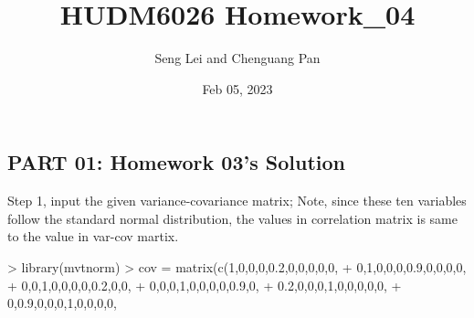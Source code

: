 \documentclass[
]{article}
\title{HUDM6026 Homework\_04}
\author{Seng Lei and Chenguang Pan}
\date{Feb 05, 2023}
\newenvironment{Shaded}{\begin{snugshade}}{\end{snugshade}}
\newcommand{\DecValTok}[1]{\textcolor[rgb]{0.00,0.00,0.81}{#1}}
\newcommand{\FloatTok}[1]{\textcolor[rgb]{0.00,0.00,0.81}{#1}}
\newcommand{\FunctionTok}[1]{\textcolor[rgb]{0.00,0.00,0.00}{#1}}
\newcommand{\NormalTok}[1]{#1}
\newcommand{\OtherTok}[1]{\textcolor[rgb]{0.56,0.35,0.01}{#1}}
\newcommand{\SpecialCharTok}[1]{\textcolor[rgb]{0.00,0.00,0.00}{#1}}
\begin{document}
\maketitle

\hypertarget{part-01-homework-03s-solution}{%
\subsection{PART 01: Homework 03's
Solution}\label{part-01-homework-03s-solution}}

Step 1, input the given variance-covariance matrix; Note, since these
ten variables follow the standard normal distribution, the values in
correlation matrix is same to the value in var-cov martix.

\begin{Shaded}
\begin{Highlighting}[]
\SpecialCharTok{\textgreater{}} \FunctionTok{library}\NormalTok{(mvtnorm)}
\SpecialCharTok{\textgreater{}}\NormalTok{ cov }\OtherTok{=} \FunctionTok{matrix}\NormalTok{(}\FunctionTok{c}\NormalTok{(}\DecValTok{1}\NormalTok{,}\DecValTok{0}\NormalTok{,}\DecValTok{0}\NormalTok{,}\DecValTok{0}\NormalTok{,}\FloatTok{0.2}\NormalTok{,}\DecValTok{0}\NormalTok{,}\DecValTok{0}\NormalTok{,}\DecValTok{0}\NormalTok{,}\DecValTok{0}\NormalTok{,}\DecValTok{0}\NormalTok{,}
\SpecialCharTok{+}                \DecValTok{0}\NormalTok{,}\DecValTok{1}\NormalTok{,}\DecValTok{0}\NormalTok{,}\DecValTok{0}\NormalTok{,}\DecValTok{0}\NormalTok{,}\FloatTok{0.9}\NormalTok{,}\DecValTok{0}\NormalTok{,}\DecValTok{0}\NormalTok{,}\DecValTok{0}\NormalTok{,}\DecValTok{0}\NormalTok{,}
\SpecialCharTok{+}                \DecValTok{0}\NormalTok{,}\DecValTok{0}\NormalTok{,}\DecValTok{1}\NormalTok{,}\DecValTok{0}\NormalTok{,}\DecValTok{0}\NormalTok{,}\DecValTok{0}\NormalTok{,}\DecValTok{0}\NormalTok{,}\FloatTok{0.2}\NormalTok{,}\DecValTok{0}\NormalTok{,}\DecValTok{0}\NormalTok{,}
\SpecialCharTok{+}                \DecValTok{0}\NormalTok{,}\DecValTok{0}\NormalTok{,}\DecValTok{0}\NormalTok{,}\DecValTok{1}\NormalTok{,}\DecValTok{0}\NormalTok{,}\DecValTok{0}\NormalTok{,}\DecValTok{0}\NormalTok{,}\DecValTok{0}\NormalTok{,}\FloatTok{0.9}\NormalTok{,}\DecValTok{0}\NormalTok{,}
\SpecialCharTok{+}                \FloatTok{0.2}\NormalTok{,}\DecValTok{0}\NormalTok{,}\DecValTok{0}\NormalTok{,}\DecValTok{0}\NormalTok{,}\DecValTok{1}\NormalTok{,}\DecValTok{0}\NormalTok{,}\DecValTok{0}\NormalTok{,}\DecValTok{0}\NormalTok{,}\DecValTok{0}\NormalTok{,}\DecValTok{0}\NormalTok{,}
\SpecialCharTok{+}                \DecValTok{0}\NormalTok{,}\FloatTok{0.9}\NormalTok{,}\DecValTok{0}\NormalTok{,}\DecValTok{0}\NormalTok{,}\DecValTok{0}\NormalTok{,}\DecValTok{1}\NormalTok{,}\DecValTok{0}\NormalTok{,}\DecValTok{0}\NormalTok{,}\DecValTok{0}\NormalTok{,}\DecValTok{0}\NormalTok{,}

\end{Highlighting}
\end{Shaded}
\end{document}
